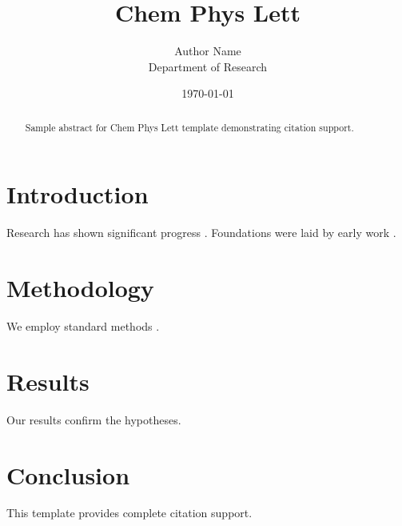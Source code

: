 ﻿\documentclass{elsarticle}
\title{Chem Phys Lett}
\author{Author Name \\ \small Department of Research}
\date{\today}
\begin{document}
\maketitle

\begin{abstract}
Sample abstract for Chem Phys Lett template demonstrating citation support.
\end{abstract}

\section{Introduction}
Research has shown significant progress \citep{einstein1905}. Foundations were laid by early work \citep{turing1950}.

\section{Methodology}
We employ standard methods \citep{knuth1984}.

\section{Results}
Our results confirm the hypotheses.

\section{Conclusion}
This template provides complete citation support.



\end{document}

